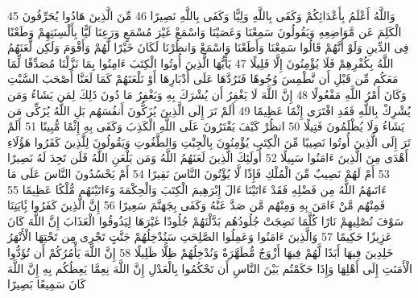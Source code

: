 {\tiny\colorbox{cl_aya}{45}} وَاللَّهُ أَعْلَمُ بِأَعْدَائِكُمْ وَكَفَى بِاللَّهِ وَلِيًّا وَكَفَى بِاللَّهِ نَصِيرًا
{\tiny\colorbox{cl_aya}{46}} مِّنَ الَّذِينَ هَادُوا يُحَرِّفُونَ الْكَلِمَ عَن مَّوَاضِعِهِ وَيَقُولُونَ سَمِعْنَا وَعَصَيْنَا وَاسْمَعْ غَيْرَ مُسْمَعٍ وَرَعِنَا لَيًّا بِأَلْسِنَتِهِمْ وَطَعْنًا فِى الدِّينِ وَلَوْ أَنَّهُمْ قَالُوا سَمِعْنَا وَأَطَعْنَا وَاسْمَعْ وَانظُرْنَا لَكَانَ خَيْرًا لَّهُمْ وَأَقْوَمَ وَلَكِن لَّعَنَهُمُ اللَّهُ بِكُفْرِهِمْ فَلَا يُؤْمِنُونَ إِلَّا قَلِيلًا
{\tiny\colorbox{cl_aya}{47}} يَأَيُّهَا الَّذِينَ أُوتُوا الْكِتَبَ ءَامِنُوا بِمَا نَزَّلْنَا مُصَدِّقًا لِّمَا مَعَكُم مِّن قَبْلِ أَن نَّطْمِسَ وُجُوهًا فَنَرُدَّهَا عَلَى أَدْبَارِهَا أَوْ نَلْعَنَهُمْ كَمَا لَعَنَّا أَصْحَبَ السَّبْتِ وَكَانَ أَمْرُ اللَّهِ مَفْعُولًا
{\tiny\colorbox{cl_aya}{48}} إِنَّ اللَّهَ لَا يَغْفِرُ أَن يُشْرَكَ بِهِ وَيَغْفِرُ مَا دُونَ ذَلِكَ لِمَن يَشَاءُ وَمَن يُشْرِكْ بِاللَّهِ فَقَدِ افْتَرَى إِثْمًا عَظِيمًا
{\tiny\colorbox{cl_aya}{49}} أَلَمْ تَرَ إِلَى الَّذِينَ يُزَكُّونَ أَنفُسَهُم بَلِ اللَّهُ يُزَكِّى مَن يَشَاءُ وَلَا يُظْلَمُونَ فَتِيلًا
{\tiny\colorbox{cl_aya}{50}} انظُرْ كَيْفَ يَفْتَرُونَ عَلَى اللَّهِ الْكَذِبَ وَكَفَى بِهِ إِثْمًا مُّبِينًا
{\tiny\colorbox{cl_aya}{51}} أَلَمْ تَرَ إِلَى الَّذِينَ أُوتُوا نَصِيبًا مِّنَ الْكِتَبِ يُؤْمِنُونَ بِالْجِبْتِ وَالطَّغُوتِ وَيَقُولُونَ لِلَّذِينَ كَفَرُوا هَؤُلَاءِ أَهْدَى مِنَ الَّذِينَ ءَامَنُوا سَبِيلًا
{\tiny\colorbox{cl_aya}{52}} أُولَئِكَ الَّذِينَ لَعَنَهُمُ اللَّهُ وَمَن يَلْعَنِ اللَّهُ فَلَن تَجِدَ لَهُ نَصِيرًا
{\tiny\colorbox{cl_aya}{53}} أَمْ لَهُمْ نَصِيبٌ مِّنَ الْمُلْكِ فَإِذًا لَّا يُؤْتُونَ النَّاسَ نَقِيرًا
{\tiny\colorbox{cl_aya}{54}} أَمْ يَحْسُدُونَ النَّاسَ عَلَى مَا ءَاتَىهُمُ اللَّهُ مِن فَضْلِهِ فَقَدْ ءَاتَيْنَا ءَالَ إِبْرَهِيمَ الْكِتَبَ وَالْحِكْمَةَ وَءَاتَيْنَهُم مُّلْكًا عَظِيمًا
{\tiny\colorbox{cl_aya}{55}} فَمِنْهُم مَّنْ ءَامَنَ بِهِ وَمِنْهُم مَّن صَدَّ عَنْهُ وَكَفَى بِجَهَنَّمَ سَعِيرًا
{\tiny\colorbox{cl_aya}{56}} إِنَّ الَّذِينَ كَفَرُوا بَِٔايَتِنَا سَوْفَ نُصْلِيهِمْ نَارًا كُلَّمَا نَضِجَتْ جُلُودُهُم بَدَّلْنَهُمْ جُلُودًا غَيْرَهَا لِيَذُوقُوا الْعَذَابَ إِنَّ اللَّهَ كَانَ عَزِيزًا حَكِيمًا
{\tiny\colorbox{cl_aya}{57}} وَالَّذِينَ ءَامَنُوا وَعَمِلُوا الصَّلِحَتِ سَنُدْخِلُهُمْ جَنَّتٍ تَجْرِى مِن تَحْتِهَا الْأَنْهَرُ خَلِدِينَ فِيهَا أَبَدًا لَّهُمْ فِيهَا أَزْوَجٌ مُّطَهَّرَةٌ وَنُدْخِلُهُمْ ظِلًّا ظَلِيلًا
{\tiny\colorbox{cl_aya}{58}} إِنَّ اللَّهَ يَأْمُرُكُمْ أَن تُؤَدُّوا الْأَمَنَتِ إِلَى أَهْلِهَا وَإِذَا حَكَمْتُم بَيْنَ النَّاسِ أَن تَحْكُمُوا بِالْعَدْلِ إِنَّ اللَّهَ نِعِمَّا يَعِظُكُم بِهِ إِنَّ اللَّهَ كَانَ سَمِيعًا بَصِيرًا
